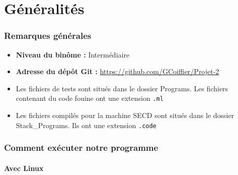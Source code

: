 \part{Généralités}

\section*{Remarques générales}

\begin{itemize}
 \setlength\itemsep{3pt}
 \item \textbf{Niveau du binôme :} Intermédiaire
 \item \textbf{Adresse du dépôt Git :} \url{https://github.com/GCoiffier/Projet-2}
 \item Les fichiers de tests sont situés dans le dossier Programs. Les fichiers contenant du code fouine ont une extension \texttt{.ml}
 \item Les fichiers compilés pour la machine SECD sont situés dans le dossier Stack\_Programs. Ils ont une extension \texttt{.code}
 \end{itemize}

\section{Comment exécuter notre programme}

\subsection{Avec Linux}

